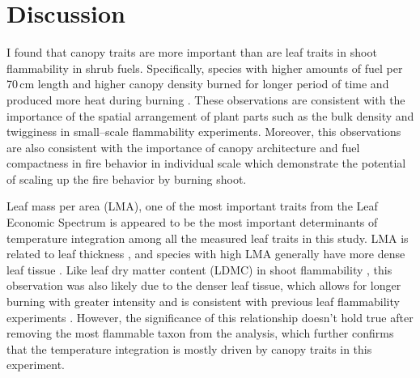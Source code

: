 \documentclass[12pt]{report}
\begin{document}


\section{Discussion}

I found that canopy traits are more important than are leaf traits in shoot flammability in shrub fuels. %
Specifically, species with higher amounts of fuel per 70\,cm length and higher canopy density burned for longer period of time and produced more heat during burning . These observations are consistent with the importance of the spatial arrangement of plant parts such as the bulk density \citep{pausas2012fires} and twigginess \citep{potts2022growth} in small--scale flammability experiments. Moreover, this observations are also consistent with the importance of canopy architecture and fuel compactness  in fire behavior in individual scale \citep{schwilk2003flammability, madrigal2012evaluation} which demonstrate the potential of scaling up the fire behavior by burning shoot.





Leaf mass per area (LMA), one of the most important traits from the Leaf Economic Spectrum \citep{wright2004worldwide} is appeared to be the most important determinants of temperature integration among all the measured leaf traits in this study. LMA is related to leaf thickness \citep{niinemets1999research}, and species with high LMA generally have more dense leaf tissue \citep{poorter2009causes}. Like leaf dry matter content (LDMC) in shoot flammability \citep{alam2020shoot, potts2022growth}, this observation
was also likely due to the denser leaf tissue, which allows for longer burning with greater intensity and is consistent with previous leaf flammability experiments \citep{krix2018landscape}.
However, the significance of this relationship doesn’t hold true after removing the most flammable taxon from the analysis, which further confirms that the temperature integration is mostly driven by canopy traits in this experiment.\\
\end{document}
